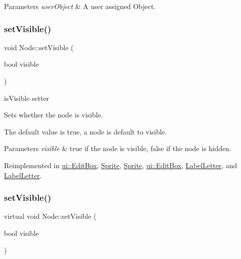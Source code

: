 \begin{DoxyParams}{Parameters}
{\em user\+Object} & A user assigned Object. \\
\hline
\end{DoxyParams}
\mbox{\label{classNode_ad8d9f6f838941a2a8ae18420757af158}} 
\subsubsection{\texorpdfstring{set\+Visible()}{setVisible()}\hspace{0.1cm}{\footnotesize\ttfamily [1/2]}}
{\footnotesize\ttfamily void Node\+::set\+Visible (\begin{DoxyParamCaption}\item[{bool}]{visible }\end{DoxyParamCaption})\hspace{0.3cm}{\ttfamily [virtual]}}



is\+Visible setter 

Sets whether the node is visible.

The default value is true, a node is default to visible.


\begin{DoxyParams}{Parameters}
{\em visible} & true if the node is visible, false if the node is hidden. \\
\hline
\end{DoxyParams}


Reimplemented in \hyperlink{classui_1_1EditBox_a73a03efc1b904b6386d037fdcdc7ff92}{ui\+::\+Edit\+Box}, \hyperlink{classSprite_a5bf8d98b0feb78acf0bbf4b3b3fa6d59}{Sprite}, \hyperlink{classSprite_abdaaa50259a13af3d6e8effded4ba42b}{Sprite}, \hyperlink{classui_1_1EditBox_afd90efc8e80090f96e54f39520405883}{ui\+::\+Edit\+Box}, \hyperlink{classLabelLetter_aa46db980ecd91de0f00c7aee1f2f52f9}{Label\+Letter}, and \hyperlink{classLabelLetter_aa46db980ecd91de0f00c7aee1f2f52f9}{Label\+Letter}.

\mbox{\label{classNode_aa6dd28750fa14ef6e2ec4525c4491ad8}} 
\subsubsection{\texorpdfstring{set\+Visible()}{setVisible()}\hspace{0.1cm}{\footnotesize\ttfamily [2/2]}}
{\footnotesize\ttfamily virtual void Node\+::set\+Visible (\begin{DoxyParamCaption}\item[{bool}]{visible }\end{DoxyParamCaption})\hspace{0.3cm}{\ttfamily [virtual]}}

